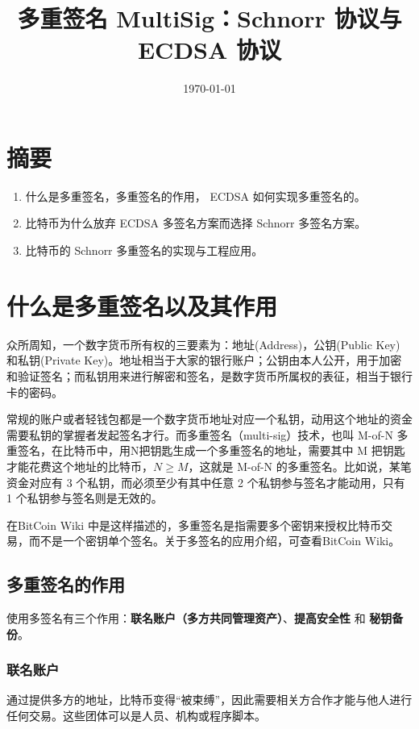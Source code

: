 \documentclass[a4paper,10pt]{article}
\title{多重签名 MultiSig：Schnorr 协议与 ECDSA 协议}
\date{\today}
\begin{document}
\maketitle

\section{摘要}
\begin{enumerate}
  \item 什么是多重签名，多重签名的作用， ECDSA 如何实现多重签名的。
  \item 比特币为什么放弃 ECDSA 多签名方案而选择 Schnorr 多签名方案。
  \item 比特币的 Schnorr 多重签名的实现与工程应用。
\end{enumerate}

\section{什么是多重签名以及其作用}

众所周知，一个数字货币所有权的三要素为：地址(Address)，公钥(Public Key) 和私钥(Private Key)。地址相当于大家的银行账户；公钥由本人公开，用于加密和验证签名；而私钥用来进行解密和签名，是数字货币所属权的表征，相当于银行卡的密码。

常规的账户或者轻钱包都是一个数字货币地址对应一个私钥，动用这个地址的资金需要私钥的掌握者发起签名才行。而多重签名（multi-sig）技术，也叫 M-of-N 多重签名，在比特币中，用N把钥匙生成一个多重签名的地址，需要其中 M 把钥匙才能花费这个地址的比特币，\(N\ge M\)，这就是 M-of-N 的多重签名。比如说，某笔资金对应有 3 个私钥，而必须至少有其中任意 2 个私钥参与签名才能动用，只有 1 个私钥参与签名则是无效的。

在BitCoin Wiki\cite{BitCoin Wiki} 中是这样描述的，多重签名是指需要多个密钥来授权比特币交易，而不是一个密钥单个签名。关于多签名的应用介绍，可查看BitCoin Wiki\cite{BitCoin Wiki}。

\subsection{ 多重签名的作用}
使用多签名有三个作用：\textbf{联名账户（多方共同管理资产）}、\textbf{提高安全性} 和 \textbf{秘钥备份}。

\subsubsection{联名账户}

通过提供多方的地址，比特币变得“被束缚”，因此需要相关方合作才能与他人进行任何交易。这些团体可以是人员、机构或程序脚本。
\end{document}
